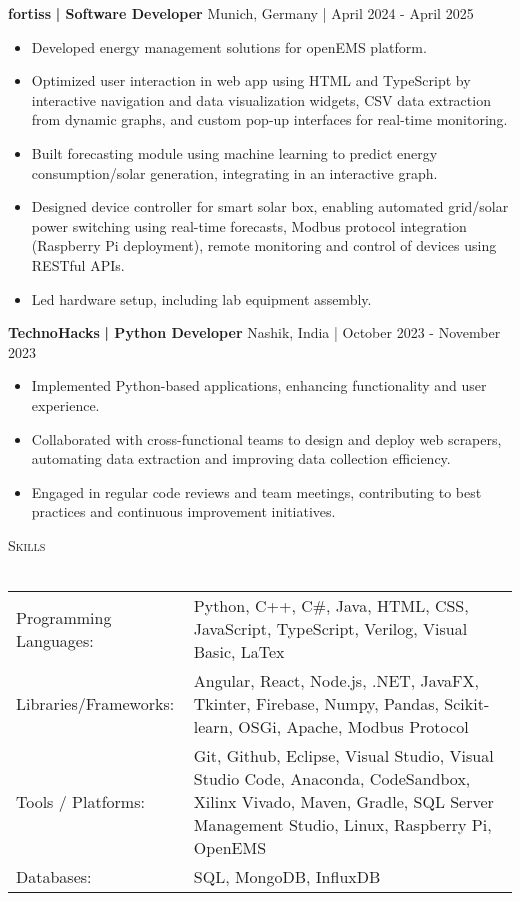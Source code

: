 \documentclass[a4paper]{article}
\newcommand{\lineunder} {
    \vspace*{-8pt} \\
    \hspace*{-18pt} \hrulefill \\
}
\newcommand{\header} [1] {
    {\hspace*{-18pt}\vspace*{6pt} \textsc{#1}}
    \vspace*{-6pt} \lineunder
}
\begin{document}
      \textbf{fortiss}\textbf{ | Software Developer} \hfill Munich, Germany | April 2024 - April 2025\\
          \vspace{-3mm}
\begin{itemize} \itemsep -3pt
\item  Developed energy management solutions for openEMS platform.
\item  Optimized user interaction in web app using HTML and TypeScript by interactive navigation and data visualization widgets, CSV data extraction from dynamic graphs, and custom pop-up interfaces for real-time monitoring.
\item  Built forecasting module using machine learning to predict energy consumption/solar generation, integrating in an interactive graph.
\item  Designed device controller for smart solar box, enabling automated grid/solar power switching using real-time forecasts, Modbus protocol integration (Raspberry Pi deployment), remote monitoring and control of devices using RESTful APIs.
\item  Led hardware setup, including lab equipment assembly.
\end{itemize}
      \textbf{TechnoHacks}\textbf{ | Python Developer} \hfill Nashik, India | October 2023 - November 2023\\
          \vspace{-3mm}
\begin{itemize} \itemsep -3pt
\item  Implemented Python-based applications, enhancing functionality and user experience.
\item  Collaborated with cross-functional teams to design and deploy web scrapers, automating data extraction and improving data collection efficiency.
\item  Engaged in regular code reviews and team meetings, contributing to best practices and continuous improvement initiatives.
\end{itemize}

%
%
  \header{Skills}
  \vspace{2mm}
  \begin{longtable}{p{4cm}p{12cm}}
  Programming Languages: & Python, C++, C\#, Java, HTML, CSS, JavaScript, TypeScript, Verilog, Visual Basic, LaTex \\
  Libraries/Frameworks: & Angular, React, Node.js, .NET, JavaFX, Tkinter, Firebase, Numpy, Pandas, Scikit-learn, OSGi, Apache, Modbus Protocol \\
  Tools / Platforms: & Git, Github, Eclipse, Visual Studio, Visual Studio Code, Anaconda, CodeSandbox, Xilinx Vivado, Maven, Gradle, SQL Server Management Studio, Linux, Raspberry Pi, OpenEMS \\
  Databases: & SQL, MongoDB, InfluxDB \\
  \end{longtable}
  \vspace{1mm}
\end{document}
